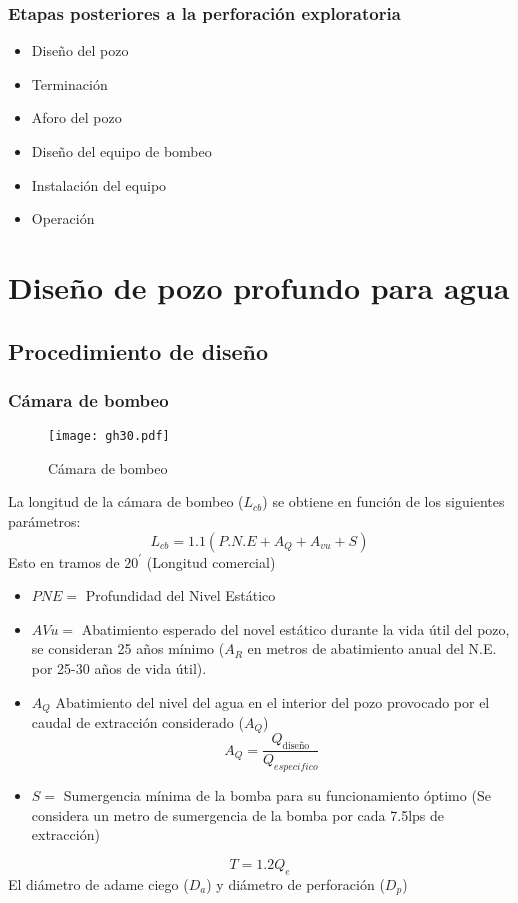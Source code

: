 \subsubsection{Etapas posteriores a la perforación exploratoria}
\begin{itemize}
    \item Diseño del pozo
    \item Terminación 
    \item Aforo del pozo
    \item Diseño del equipo de bombeo
    \item Instalación del equipo
    \item Operación
\end{itemize}
\section{Diseño de pozo profundo para agua}
\subsection{Procedimiento de diseño}
\subsubsection{Cámara de bombeo}
\begin{figure}[h!]
\centering
  \texttt{[image: gh30.pdf]}
  \caption{Cámara de bombeo}
  \label{gh30}
\end{figure}
La longitud de la cámara de bombeo ($L_{cb}$) se obtiene en función de los siguientes parámetros:
\begin{equation}
    L_{cb} = 1.1\left(P.N.E + A_Q + A_{vu} + S\right)
\end{equation}
Esto en tramos de $20^{\prime}$ (Longitud comercial)
\begin{notation}
    \begin{itemize}
        \item $PNE=$ Profundidad del Nivel Estático
        \item $AVu=$ Abatimiento esperado del novel estático durante la vida útil del pozo, se consideran 25 años mínimo ($A_R$ en metros de abatimiento anual del N.E. por 25-30 años de vida útil).
        \item $A_Q$ Abatimiento del nivel del agua en el interior del pozo provocado por el caudal de extracción considerado ($A_Q$) 
        \begin{equation}
            A_Q = \frac{Q_{\text{diseño}}}{Q_{especifico}}
        \end{equation}
        \item $S=$ Sumergencia mínima de la bomba para su funcionamiento óptimo (Se considera un metro de sumergencia de la bomba por cada 7.5lps de extracción)
    \end{itemize}
\end{notation}
\begin{equation}
    T = 1.2Q_e
\end{equation}
El diámetro de adame ciego ($D_a$) y diámetro de perforación ($D_p$)

